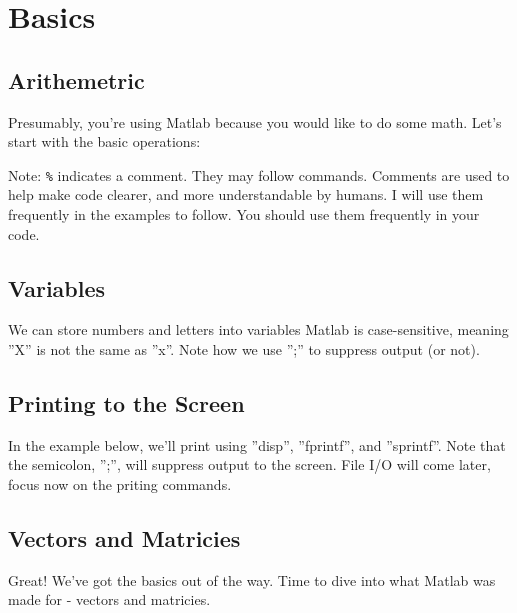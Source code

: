 
\section{Basics}

\subsection{Arithemetric}
Presumably, you're using Matlab because you would like to do some math.
 Let's start with the basic operations:

\begin{quote}

\end{quote}
\noindent Note: \texttt{\%} indicates a comment.
 They may follow commands.
 Comments are used to help make code clearer, and more understandable by humans.
 I will use them frequently in the examples to follow.
 You should use them frequently in your code.

\pagebreak
\subsection{Variables}
We can store numbers and letters into variables
 Matlab is case-sensitive, meaning ''X'' is not the same as ''x''.
 Note how we use '';'' to suppress output (or not).

\begin{quote}

\end{quote}

\pagebreak
\subsection{Printing to the Screen}
In the example below, we'll print using
 ''disp'',
 ''fprintf'',
 and ''sprintf''.
 Note that the semicolon, '';'', will suppress output to the screen.
 File I/O will come later, focus now on the priting commands.
\begin{quote}

\end{quote}

\pagebreak
\subsection{Vectors and Matricies}
Great! We've got the basics out of the way.
 Time to dive into what Matlab was made for - vectors and matricies.

\begin{quote}

\end{quote}
